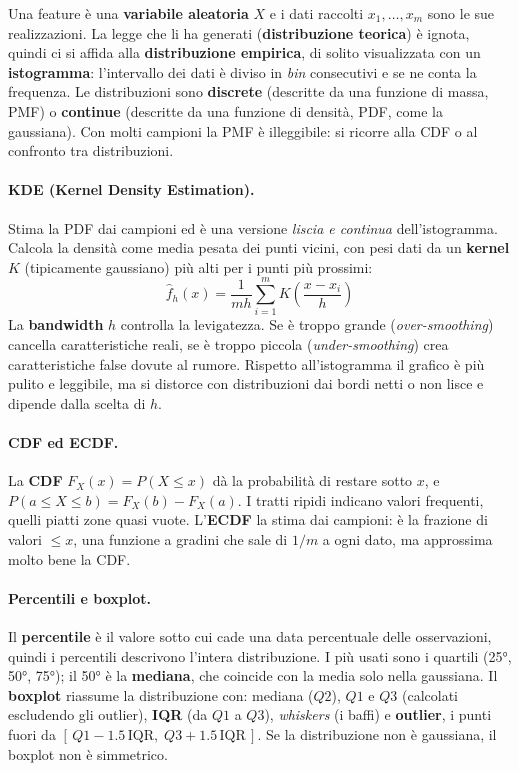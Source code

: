 Una feature è una \textbf{variabile aleatoria} $X$ e i dati raccolti $x_1,\dots,x_m$ sono le sue realizzazioni. La legge che li ha generati (\textbf{distribuzione teorica}) è ignota, quindi ci si affida alla \textbf{distribuzione empirica}, di solito visualizzata con un \textbf{istogramma}: l'intervallo dei dati è diviso in \emph{bin} consecutivi e se ne conta la frequenza. Le distribuzioni sono \textbf{discrete} (descritte da una funzione di massa, PMF) o \textbf{continue} (descritte da una funzione di densità, PDF, come la gaussiana). Con molti campioni la PMF è illeggibile: si ricorre alla CDF o al confronto tra distribuzioni.

\paragraph*{KDE (Kernel Density Estimation).}
Stima la PDF dai campioni ed è una versione \emph{liscia e continua} dell'istogramma. Calcola la densità come media pesata dei punti vicini, con pesi dati da un \textbf{kernel} $K$ (tipicamente gaussiano) più alti per i punti più prossimi:
$$\hat f_h(x)=\frac{1}{mh}\sum_{i=1}^m K\!\left(\frac{x-x_i}{h}\right)$$
La \textbf{bandwidth} $h$ controlla la levigatezza. Se è troppo grande (\emph{over-smoothing}) cancella caratteristiche reali, se è troppo piccola (\emph{under-smoothing}) crea caratteristiche false dovute al rumore. Rispetto all'istogramma il grafico è più pulito e leggibile, ma si distorce con distribuzioni dai bordi netti o non lisce e dipende dalla scelta di $h$.

\paragraph*{CDF ed ECDF.}
La \textbf{CDF} $F_X(x)=P(X\le x)$ dà la probabilità di restare sotto $x$, e $P(a\le X\le b)=F_X(b)-F_X(a)$. I tratti ripidi indicano valori frequenti, quelli piatti zone quasi vuote. L'\textbf{ECDF} la stima dai campioni: è la frazione di valori $\le x$, una funzione a gradini che sale di $1/m$ a ogni dato, ma approssima molto bene la CDF.

\paragraph*{Percentili e boxplot.}
Il \textbf{percentile} è il valore sotto cui cade una data percentuale delle osservazioni, quindi i percentili descrivono l'intera distribuzione. I più usati sono i quartili (25°, 50°, 75°); il 50° è la \textbf{mediana}, che coincide con la media solo nella gaussiana. Il \textbf{boxplot} riassume la distribuzione con: mediana ($Q2$), $Q1$ e $Q3$ (calcolati escludendo gli outlier), \textbf{IQR} (da $Q1$ a $Q3$), \emph{whiskers} (i baffi) e \textbf{outlier}, i punti fuori da $[\,Q1-1.5\,\mathrm{IQR},\;Q3+1.5\,\mathrm{IQR}\,]$. Se la distribuzione non è gaussiana, il boxplot non è simmetrico.

